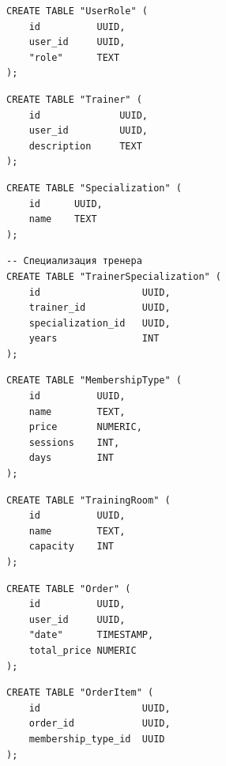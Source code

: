 \begin{lstlisting}[label=alg:2, caption=Реализация создания отношения UserRole, captionpos=t]
CREATE TABLE "UserRole" (
	id			UUID,
	user_id		UUID,
	"role" 		TEXT
);
\end{lstlisting}

\begin{lstlisting}[label=alg:3, caption=Реализация создания отношения Trainer, captionpos=t]
CREATE TABLE "Trainer" (
	id 				UUID,
	user_id			UUID,
	description 	TEXT
);
\end{lstlisting}

\begin{lstlisting}[label=alg:13, caption=Реализация создания отношения Specialization, captionpos=t]
CREATE TABLE "Specialization" (
	id	 	UUID,
	name 	TEXT
);
\end{lstlisting}

\begin{lstlisting}[label=alg:4, caption=Реализация создания отношения TrainerSpecialization, captionpos=t]
-- Специализация тренера
CREATE TABLE "TrainerSpecialization" (
	id 					UUID,
	trainer_id			UUID,
	specialization_id	UUID,
	years				INT
);
\end{lstlisting}

\begin{lstlisting}[label=alg:5, caption=Реализация создания отношения MembershipType, captionpos=t]
CREATE TABLE "MembershipType" (
	id 			UUID,
	name 		TEXT,
	price 		NUMERIC,
	sessions	INT,
	days		INT
);
\end{lstlisting}

\begin{lstlisting}[label=alg:6, caption=Реализация создания отношения TrainingRoom, captionpos=t]
CREATE TABLE "TrainingRoom" (
	id			UUID,
	name	 	TEXT,
	capacity 	INT
);
\end{lstlisting}

\begin{lstlisting}[label=alg:7, caption=Реализация создания отношения Order, captionpos=t]
CREATE TABLE "Order" (
	id 			UUID,
	user_id		UUID,
	"date" 		TIMESTAMP,
	total_price NUMERIC
);
\end{lstlisting}

\begin{lstlisting}[label=alg:8, caption=Реализация создания отношения OrderItem, captionpos=t]
CREATE TABLE "OrderItem" (
	id 					UUID,
	order_id 			UUID,
	membership_type_id 	UUID
);
\end{lstlisting}


